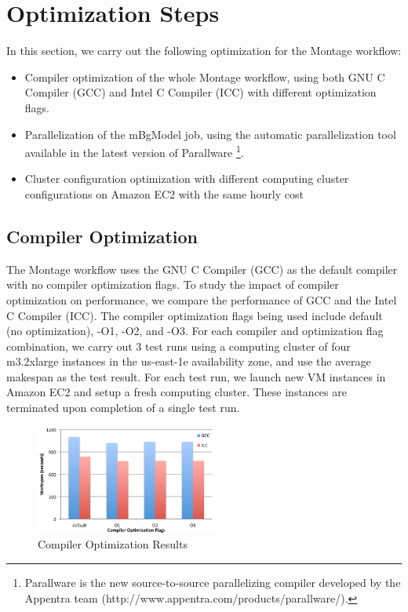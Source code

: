 \section{Optimization Steps}
\label{v1_sec:parallel}

In this section, we carry out the following optimization for the Montage workflow:

\begin{itemize}
	\item Compiler optimization of the whole Montage workflow, using both GNU C Compiler (GCC) and Intel C Compiler (ICC) with different optimization flags.  	
	\item Parallelization of the mBgModel job, using the automatic parallelization tool available in the latest version of Parallware \footnote{Parallware is the new source-to-source parallelizing compiler developed by the Appentra team  (http://www.appentra.com/products/parallware/).}. 
	\item Cluster configuration optimization with different computing cluster configurations on Amazon EC2 with the same hourly cost 
\end{itemize}


\subsection{Compiler Optimization}
\label{sec:compiler}

The Montage workflow uses the GNU C Compiler (GCC) as the default compiler with no compiler optimization flags. To study the impact of compiler optimization on performance, we compare the performance of GCC and the Intel C Compiler (ICC). The compiler optimization flags being used include default (no optimization), -O1, -O2, and -O3. For each compiler and optimization flag combination, we carry out 3 test runs using a computing cluster of four m3.2xlarge instances in the us-east-1e availability zone, and use the average makespan as the test result. For each test run, we launch new VM instances in Amazon EC2 and setup a fresh computing cluster. These instances are terminated upon completion of a single test run. 

\begin{figure}[t!]
\centering
\includegraphics[width=6cm]{fig01}
\vspace{-5pt}
\caption{Compiler Optimization Results}
\vspace{-10pt}
\label{fig:compiler}
\end{figure}


